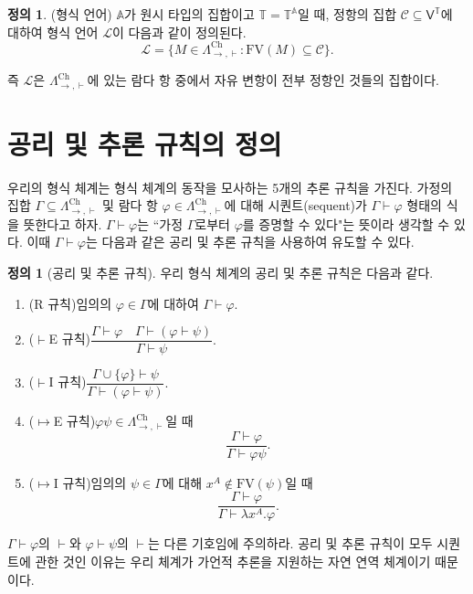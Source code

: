 \documentclass[10pt,twocolumn]{article}
\theoremstyle{definition}
\newtheorem{definition}[theorem]{정의}
\newcommand{\Lchh}{\Lambda_{\to,\vdash}^{\text{Ch}}}
\begin{document}
\begin{definition}(형식 언어)
	$\mathbb A$가 원시 타입의 집합이고 $\mathds T = \mathds T^{\mathbb A}$일 때, 정항의 집합 $\mathcal C\subseteq \mathsf V^{\mathds T}$에 대하여 형식 언어 $\mathcal L$이 다음과 같이 정의된다.
	$$\mathcal L = \{M\in\Lchh: \mathrm{FV}(M)\subseteq\mathcal C\}.$$
\end{definition}

즉 $\mathcal L$은 $\Lchh$에 있는 람다 항 중에서 자유 변항이 전부 정항인 것들의 집합이다.

\section{공리 및 추론 규칙의 정의}

우리의 형식 체계는 형식 체계의 동작을 모사하는 5개의 추론 규칙을 가진다. 가정의 집합 $\Gamma\subseteq\Lchh$ 및 람다 항 $\varphi\in\Lchh$에 대해 시퀀트(sequent)가 $\Gamma\vdash\varphi$ 형태의 식을 뜻한다고 하자. $\Gamma\vdash\varphi$는 ``가정 $\Gamma$로부터 $\varphi$를 증명할 수 있다"는 뜻이라 생각할 수 있다. 이때 $\Gamma\vdash\varphi$는 다음과 같은 공리 및 추론 규칙을 사용하여 유도할 수 있다.

\begin{definition}[공리 및 추론 규칙]
	우리 형식 체계의 공리 및 추론 규칙은 다음과 같다.
	
	\begin{enumerate}
		\item (R 규칙)\quad 임의의 $\varphi\in\Gamma$에 대하여 $\Gamma\vdash\varphi.$
		\item ($\vdash$E 규칙)\quad $\dfrac{\Gamma\vdash\varphi\quad\Gamma\vdash(\varphi\vdash\psi)}{\Gamma\vdash\psi}.$
		\item ($\vdash$I 규칙)\quad $\dfrac{\Gamma\cup\{\varphi\}\vdash\psi}{\Gamma\vdash(\varphi\vdash\psi)}.$
		\item ($\mapsto$E 규칙)\quad $\varphi\psi\in\Lchh$일 때 $$\dfrac{\Gamma\vdash\varphi}{\Gamma\vdash\varphi\psi}.$$
		\item ($\mapsto$I 규칙)\quad 임의의 $\psi\in\Gamma$에 대해 $x^A\notin\mathrm{FV}(\psi)$일 때 $$\dfrac{\Gamma\vdash\varphi}{\Gamma\vdash\lambda x^A.\varphi}.$$
	\end{enumerate}
\end{definition}

$\Gamma\vdash\varphi$의 $\vdash$와 $\varphi\vdash\psi$의 $\vdash$는 다른 기호임에 주의하라. 공리 및 추론 규칙이 모두 시퀀트에 관한 것인 이유는 우리 체계가 가언적 추론을 지원하는 자연 연역 체계이기 때문이다.
\end{document}
